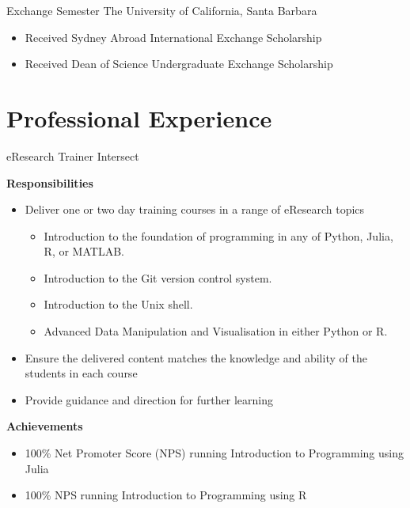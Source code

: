 {Exchange Semester}
{The University of California, Santa Barbara}{}{}
{%
\begin{itemize}
  \item Received Sydney Abroad International Exchange Scholarship
  \item Received Dean of Science Undergraduate Exchange Scholarship
\end{itemize}
}

\nocite{*}
\printbibliography[title={Publications}]

\pagebreak
\section{Professional Experience}

{eResearch Trainer}
{Intersect}{}{}
{%
  \textbf{Responsibilities}
  \begin{itemize}
    \item Deliver one or two day training courses in a range of eResearch topics
      \begin{itemize}
        \item Introduction to the foundation of programming in any of Python, Julia, R, or MATLAB.
        \item Introduction to the Git version control system.
        \item Introduction to the Unix shell.
        \item Advanced Data Manipulation and Visualisation in either Python or R.
      \end{itemize}
    \item Ensure the delivered content matches the knowledge and ability of the students in each
      course
    \item Provide guidance and direction for further learning
  \end{itemize}
  \textbf{Achievements}
  \begin{itemize}
    \item 100\% Net Promoter Score (NPS) running Introduction to Programming using Julia
    \item 100\% NPS running Introduction to Programming using R
  \end{itemize}
}

